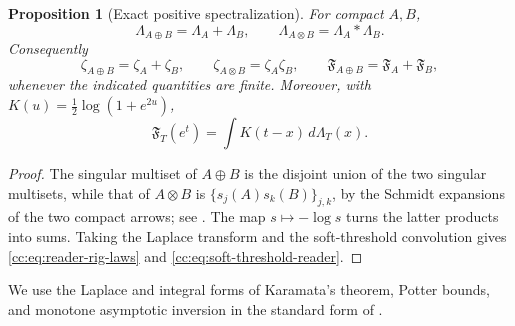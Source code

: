 \documentclass[10pt,reqno]{amsart}
\theoremstyle{plain}
\newtheorem{proposition}[theorem]{Proposition}
\theoremstyle{definition}
\theoremstyle{remark}
\begin{document}
\begin{proposition}[Exact positive spectralization]
\label{cc:prop:positive-spectralization}
For compact \(A,B\),
\begin{equation}
 \Lambda_{A\oplus B}=\Lambda_A+\Lambda_B,
 \qquad
 \Lambda_{A\otimes B}=\Lambda_A*\Lambda_B.
 \label{cc:eq:rig-law}
\end{equation}
Consequently
\begin{equation}
 \zeta_{A\oplus B}=\zeta_A+\zeta_B,
 \qquad
 \zeta_{A\otimes B}=\zeta_A\zeta_B,
 \qquad
 \mathfrak F_{A\oplus B}=\mathfrak F_A+\mathfrak F_B,
 \label{cc:eq:reader-rig-laws}
\end{equation}
whenever the indicated quantities are finite.  Moreover, with
\(K(u)=\frac12\log(1+e^{2u})\),
\begin{equation}
 \mathfrak F_T(e^t)=\int K(t-x)\,d\Lambda_T(x).
 \label{cc:eq:soft-threshold-reader}
\end{equation}
\end{proposition}

\begin{proof}
The singular multiset of \(A\oplus B\) is the disjoint union of the two
singular multisets, while that of \(A\otimes B\) is
\(\{s_j(A)s_k(B)\}_{j,k}\), by the Schmidt expansions of the two compact
arrows; see \cite{Simon05}.  The map \(s\mapsto-\log s\) turns the latter
products into sums.  Taking the Laplace transform and the soft-threshold
convolution gives \eqref{cc:eq:reader-rig-laws} and
\eqref{cc:eq:soft-threshold-reader}.
\end{proof}

We use the Laplace and integral forms of Karamata's theorem, Potter bounds,
and monotone asymptotic inversion in the standard form of
\cite[Chs.~1 and 4]{BGT87}.
\end{document}
